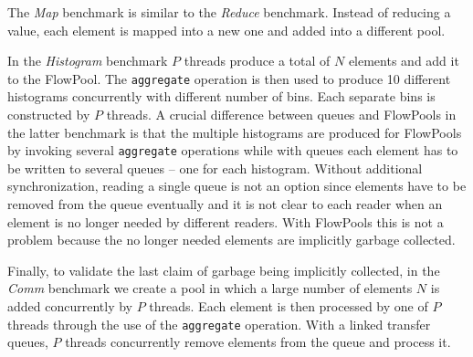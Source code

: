 \documentclass[runningheads,a4paper]{llncs}
\begin{document}
The \textit{Map} benchmark is similar to the \textit{Reduce} benchmark.
Instead of reducing a value, each element is mapped into a new
one and added into a different pool.

In the \textit{Histogram} benchmark $P$ threads produce a total of $N$
elements and add it to the FlowPool.
The \verb=aggregate= operation is then used to produce 10 different
histograms concurrently with different number of bins.
Each separate bins is constructed by $P$ threads.
A crucial difference between queues and FlowPools in the latter
benchmark is that the multiple histograms are produced for FlowPools
by invoking several \verb=aggregate= operations while with queues each
element has to be written to several queues -- one for each
histogram.
Without additional synchronization, reading a single queue is not an
option since elements have to be removed from the queue eventually and
it is not clear to each reader when an element is no longer needed by
different readers.
With FlowPools this is not a problem because the no longer needed
elements are implicitly garbage collected.

Finally, to validate the last claim of garbage being implicitly
collected, in the \textit{Comm} benchmark we create a pool in which a
large number of elements $N$ is added concurrently by $P$
threads. Each element is then processed by one of $P$ threads through
the use of the \verb=aggregate= operation.
With a linked transfer queues, $P$ threads concurrently remove
elements from the queue and process it.
\end{document}
